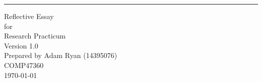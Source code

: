 \documentclass{scrreprt}
\date{}
\def\myversion{1.0 }
\begin{document}
\begin{flushright}
    \rule{16cm}{5pt}\vskip1cm
    \begin{bfseries}
        \Huge{Reflective Essay}\\
        \vspace{1.9cm}
        for\\
        \vspace{1.9cm}
        Research Practicum\\
        \vspace{1.9cm}
        \LARGE{Version \myversion}\\
        \vspace{1.9cm}
        Prepared by Adam Ryan (14395076)\\
        \vspace{1.9cm}
       COMP47360\\
        \vspace{1.9cm}
        \today\\
    \end{bfseries}
\end{flushright}
\end{document}
